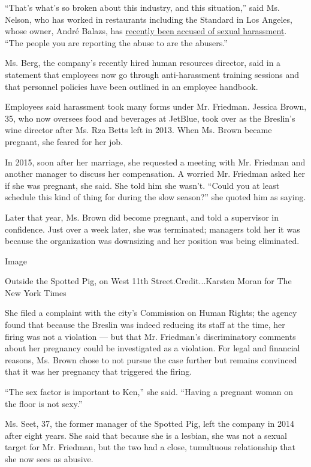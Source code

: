 ``That's what's so broken about this industry, and this situation,''
said Ms. Nelson, who has worked in restaurants including the Standard in
Los Angeles, whose owner, André Balazs, has
\href{https://www.nytimes3xbfgragh.onion/2017/11/09/style/andre-balazs-accused-of-groping-standard-chateau-marmont.html?_r=0}{recently
been accused of sexual harassment}. ``The people you are reporting the
abuse to are the abusers.''

Ms. Berg, the company's recently hired human resources director, said in
a statement that employees now go through anti-harassment training
sessions and that personnel policies have been outlined in an employee
handbook.

Employees said harassment took many forms under Mr. Friedman. Jessica
Brown, 35, who now oversees food and beverages at JetBlue, took over as
the Breslin's wine director after Ms. Rza Betts left in 2013. When Ms.
Brown became pregnant, she feared for her job.

In 2015, soon after her marriage, she requested a meeting with Mr.
Friedman and another manager to discuss her compensation. A worried Mr.
Friedman asked her if she was pregnant, she said. She told him she
wasn't. ``Could you at least schedule this kind of thing for during the
slow season?'' she quoted him as saying.

Later that year, Ms. Brown did become pregnant, and told a supervisor in
confidence. Just over a week later, she was terminated; managers told
her it was because the organization was downsizing and her position was
being eliminated.

Image

Outside the Spotted Pig, on West 11th Street.Credit...Karsten Moran for
The New York Times

She filed a complaint with the city's Commission on Human Rights; the
agency found that because the Breslin was indeed reducing its staff at
the time, her firing was not a violation --- but that Mr. Friedman's
discriminatory comments about her pregnancy could be investigated as a
violation. For legal and financial reasons, Ms. Brown chose to not
pursue the case further but remains convinced that it was her pregnancy
that triggered the firing.

``The sex factor is important to Ken,'' she said. ``Having a pregnant
woman on the floor is not sexy.''

Ms. Seet, 37, the former manager of the Spotted Pig, left the company in
2014 after eight years. She said that because she is a lesbian, she was
not a sexual target for Mr. Friedman, but the two had a close,
tumultuous relationship that she now sees as abusive.

